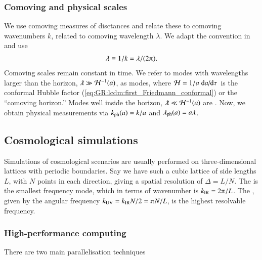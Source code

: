     \subsubsection{Comoving and physical scales}
    We use comoving measures of disctances and relate these to comoving wavenumbers $k$, related to comoving wavelength $\lambda$. We adapt the convention in~\citet{maggioreGravitationalWavesVol2018} and use 
    \begin{align}
        \lambdabar \equiv   1/k  = \lambda/(2\ppi).
    \end{align}
    Comoving scales remain constant in time. We refer to modes with wavelengths larger than the horizon, $\lambdabar\gg \mathcal{H}^{-1}(a)$, as  modes, where $\mathcal{H}=1/a \dv*{a}{\tau}$ is the conformal Hubble factor (\cref{eq:GR:lcdm:first_Friedmann_conformal}) or the ``comoving horizon.'' %
    Modes well inside the horizon, $\lambdabar\ll \mathcal{H}^{-1}(a)$ are . %
    Now, we obtain physical measurements via $k_\mathrm{ph}(a) = k /a$ and $\lambdabar\ped{ph}(a) = a \lambdabar$.

    




\subsection{Cosmological simulations}

    Simulations of cosmological scenarios are usually performed on three-dimensional lattices with periodic boundaries. Say we have such a cubic lattice of side lengths $L$, with $N$ points in each direction, giving a spatial resolution of $\Delta=L/N$. %
    The  is the smallest frequency mode, which in terms of wavenumber is $k\ped{IR}=2\ppi/L$. %
    The , given by the angular frequency $k\ped{UV}=k\ped{IR} N/2 = \ppi N/L$, is the highest resolvable frequency.


    \subsubsection{High-performance computing}

    There are two main parallelisation techniques \blahblah
    
    

    

    
    

